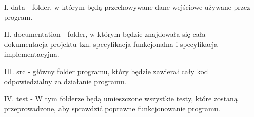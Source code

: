 \documentclass{article}
\begin{document}
        \begin{itemize}
            \item[I.] data - folder, w którym będą przechowywane dane wejściowe używane przez program.
            \item[II.] documentation - folder, w którym będzie znajdowała się cała dokumentacja projektu tzn. specyfikacja funkcjonalna i specyfikacja implementacyjna.
            \item[III.] src - główny folder programu, który będzie zawierał cały kod odpowiedzialny za działanie programu.
            \item[IV.] test - W tym folderze będą umieszczone wszystkie testy, które zostaną przeprowadzone, aby sprawdzić poprawne funkcjonowanie programu.
        \end{itemize}
\end{document}
